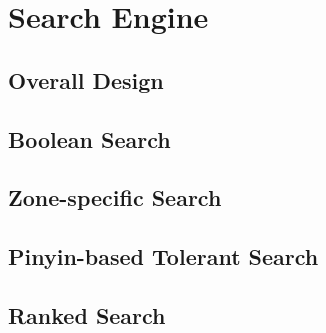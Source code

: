 \section{Search Engine} \label{sec:search}

\subsection{Overall Design}

\subsection{Boolean Search}

\subsection{Zone-specific Search}

\subsection{Pinyin-based Tolerant Search}

\subsection{Ranked Search}

